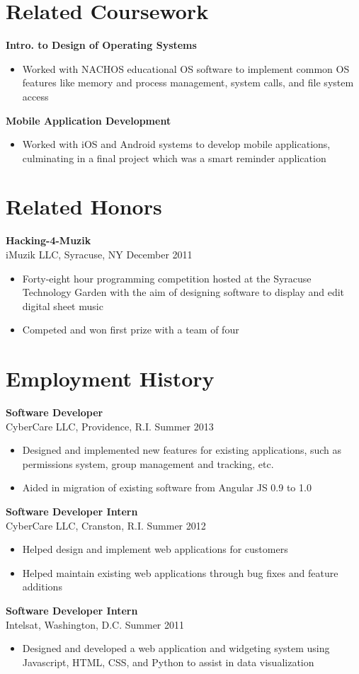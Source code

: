 \documentclass[margin]{res}
\begin{document}
\begin{resume}
\section{Related Coursework}
{\bf Intro. to Design of Operating Systems}
\begin{itemize}
\item Worked with NACHOS educational OS software to implement common OS features like memory and process management, system calls, and file system access
\end{itemize}
{\bf Mobile Application Development}
\begin{itemize}
\item Worked with iOS and Android systems to develop mobile applications, culminating in a final project which was a smart reminder application
\end{itemize}

\section{Related Honors}
{\bf Hacking-4-Muzik}\\iMuzik LLC, Syracuse, NY \hfill December 2011
\begin{itemize}
\item Forty-eight hour programming competition hosted at the Syracuse Technology Garden with the aim of designing software to display and edit digital sheet music
\item Competed and won first prize with a team of four
\end{itemize}

\section{Employment History}
{\bf Software Developer} \\CyberCare LLC, Providence, R.I. \hfill Summer 2013
\begin{itemize}
\item Designed and implemented new features for existing applications, such as permissions system, group management and tracking, etc.
\item Aided in migration of existing software from Angular JS 0.9 to 1.0
\end{itemize}
{\bf Software Developer Intern}\\CyberCare LLC, Cranston, R.I. \hfill Summer 2012
\begin{itemize}
\item Helped design and implement web applications for customers
\item Helped maintain existing web applications through bug fixes and feature additions
\end{itemize}
{\bf Software Developer Intern}\\Intelsat, Washington, D.C. \hfill Summer 2011
\begin{itemize}
\item Designed and developed a web application and widgeting system using Javascript, HTML, CSS, and Python to assist in data visualization
\end{itemize}

\end{resume} 
\end{document}
